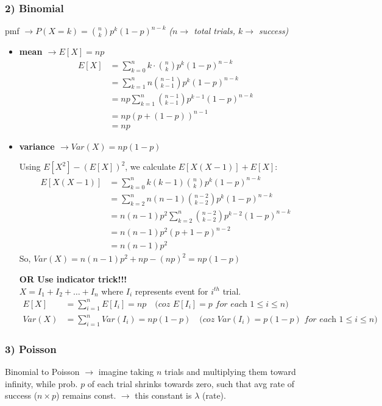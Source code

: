 \documentclass[11pt,a4paper]{article}
\begin{document}
\subsubsection*{2) Binomial}
pmf $\rightarrow P(X=k) = \binom{n}{k} p^k (1-p)^{n-k}$ \quad \textit{($n \rightarrow$ total trials, $k \rightarrow$ success)}
\begin{itemize}
    \item \textbf{mean $\rightarrow E[X] = np$}
    \begin{align*}
        E[X] &= \sum_{k=0}^n k \cdot \binom{n}{k} p^k (1-p)^{n-k} \\
        &= \sum_{k=1}^n n \binom{n-1}{k-1} p^k (1-p)^{n-k} \\
        &= np \sum_{k=1}^n \binom{n-1}{k-1} p^{k-1} (1-p)^{n-k} \\
        &= np(p + (1-p))^{n-1} \\
        &= np
    \end{align*}
    \item \textbf{variance $\rightarrow Var(X) = np(1-p)$}
    
    Using $E[X^2] - (E[X])^2$, we calculate $E[X(X-1)] + E[X]$:
    \begin{align*}
        E[X(X-1)] &= \sum_{k=0}^n k(k-1) \binom{n}{k} p^k (1-p)^{n-k} \\
        &= \sum_{k=2}^n n(n-1) \binom{n-2}{k-2} p^k (1-p)^{n-k} \\
        &= n(n-1)p^2 \sum_{k=2}^n \binom{n-2}{k-2} p^{k-2} (1-p)^{n-k} \\
        &= n(n-1)p^2(p + 1-p)^{n-2} \\
        &= n(n-1)p^2
    \end{align*}
    So, $Var(X) = n(n-1)p^2 + np - (np)^2 = np(1-p)$

    \textbf{OR Use indicator trick!!!}
    \\ $X = I_1 + I_2 + \dots + I_n$ where $I_i$ represents event for $i^{th}$ trial.
    \begin{align*}
        E[X] &= \sum_{i=1}^n E[I_i] = np \quad \textit{(coz $E[I_i] = p$ for each $1 \leq i \leq n$)} \\
        Var(X) &= \sum_{i=1}^n Var(I_i) = np(1-p) \quad \textit{(coz $Var(I_i) = p(1-p)$ for each $1 \leq i \leq n$)}
    \end{align*}
\end{itemize}

\subsubsection*{3) Poisson}
Binomial to Poisson $\rightarrow$ imagine taking $n$ trials and multiplying them toward infinity, while prob. $p$ of each trial shrinks towards zero, such that avg rate of success ($n \times p$) remains const. $\rightarrow$ this constant is $\lambda$ (rate).
\end{document}
